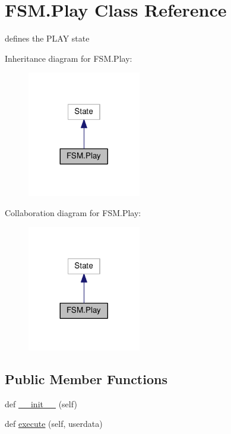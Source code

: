 \hypertarget{classFSM_1_1Play}{}\section{F\+S\+M.\+Play Class Reference}
\label{classFSM_1_1Play}


defines the P\+L\+AY state  




Inheritance diagram for F\+S\+M.\+Play\+:\nopagebreak
\begin{figure}[H]
\begin{center}
\leavevmode
\includegraphics[width=140pt]{classFSM_1_1Play__inherit__graph}
\end{center}
\end{figure}


Collaboration diagram for F\+S\+M.\+Play\+:\nopagebreak
\begin{figure}[H]
\begin{center}
\leavevmode
\includegraphics[width=140pt]{classFSM_1_1Play__coll__graph}
\end{center}
\end{figure}
\subsection*{Public Member Functions}
\begin{DoxyCompactItemize}
\item 
def \hyperlink{classFSM_1_1Play_adbcc8a351d8013f0fd40e778bc85b5e0}{\+\_\+\+\_\+init\+\_\+\+\_\+} (self)
\item 
def \hyperlink{classFSM_1_1Play_ab7c062e30152b05f18bccd330d618634}{execute} (self, userdata)
\end{DoxyCompactItemize}
